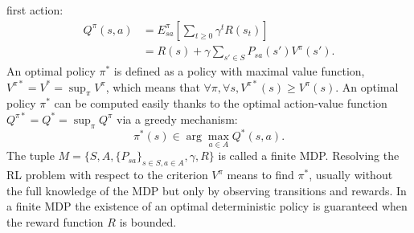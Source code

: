 \documentclass{article}
\begin{document}
first action:
%
\begin{align}
\label{Qdef.eqn} Q^\pi(s,a) & =
E^\pi_{sa}[\sum_{t\geq0}\gamma^tR(s_t)]\\
& = R(s) + \gamma\sum_{s'\in S}P_{sa}(s') V^\pi(s').
\end{align}
%
%
%
An optimal policy $\pi^*$ is defined as a policy with maximal value
function, $V^{\pi*}=V^*=\sup_{\pi}V^{\pi}$, which means that
$\forall \pi, \forall s, V^{\pi*}(s) \geq V^\pi(s)$. An optimal
policy $\pi^*$ can be computed easily thanks to the optimal
action-value function $Q^{\pi*}=Q^*=\sup_{\pi}Q^\pi$ via a greedy
mechanism:
%
\begin{equation}
\label{greedy.eqn} \pi^*(s) \in \arg\max_{a\in A} Q^*(s,a).
\end{equation}
%
The tuple $M=\{S,A,\{P_{sa}\}_{s\in S,a\in A},\gamma,R\}$ is called
a finite MDP. Resolving the RL problem with respect to the criterion
$V^\pi$  means to find $\pi^*$, usually without the full knowledge
of the MDP but only by observing transitions and rewards. In a
finite MDP the existence of an optimal deterministic policy is
guaranteed when the reward function $R$ is bounded.
%
\end{document}
